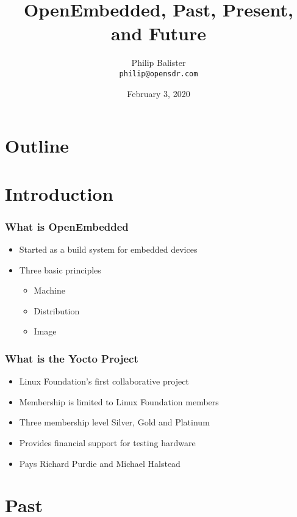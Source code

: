\documentclass{beamer}
\title{OpenEmbedded, Past, Present, and Future}
\institute{Open SDR}
\author{Philip Balister \\
\tt\tiny philip@opensdr.com}
\date{February 3, 2020}
\begin{document}
 

\begin{frame}
\titlepage
\end{frame}

\section*{Outline}

\begin{frame}
  \tableofcontents
\end{frame}

\section{Introduction}

\begin{frame}
\frametitle{What is OpenEmbedded}

\begin{itemize}
\item Started as a build system for embedded devices
\item Three basic principles
	\begin{itemize}
		\item{Machine}
		\item{Distribution}
		\item{Image}
	\end{itemize}
\end{itemize}

\end{frame}

\begin{frame}
\frametitle{What is the Yocto Project}

\begin{itemize}
\item Linux Foundation's first collaborative project
\item Membership is limited to Linux Foundation members
\item Three membership level Silver, Gold and Platinum
\item Provides financial support for testing hardware
\item Pays Richard Purdie and Michael Halstead
\end{itemize}

\end{frame}

\section{Past}
\end{document}
